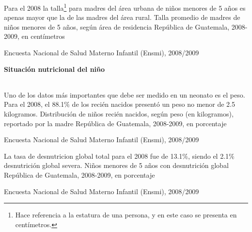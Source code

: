 
%
{%
	Para el 2008 la talla\footnote{Hace referencia a la estatura de una persona, y en este caso se presenta en centímetros.} para madres del área urbana de niños menores de 5 años es apenas mayor que la de las madres del área rural. 
}%
{%
	Talla promedio de madres  de niños menores de 5 años, según área de residencia} %
{%
	República de Guatemala, 2008-2009, en centímetros} %
{%
	\begin{tikzpicture}[x=1pt,y=1pt]    \end{tikzpicture}}%
{%
	Encuesta Nacional de Salud Materno Infantil (Ensmi), 2008/2009} %

\begin{center}
	\textbf{\color{color2}\LARGE \thesection} \quad  \textbf{\LARGE Situación nutricional del niño} 
\end{center} $ \ $\\[-5cm]
%
{%
	Uno de los datos más importantes que debe ser medido en un neonato es el peso.
	Para el 2008, el 88.1\% de los recién nacidos presentó un peso no menor de  2.5 kilogramos. 
}%
{%
	Distribución de niños recién nacidos, según peso (en kilogramos), reportado por la madre} %
{%
	República de Guatemala, 2008-2009, en porcentaje} %
{%
	\begin{tikzpicture}[x=1pt,y=1pt]    \end{tikzpicture}}%
{%
	Encuesta Nacional de Salud Materno Infantil (Ensmi), 2008/2009} %


%
{%
	La tasa de desnutricion global total para el 2008 fue de 13.1\%, siendo el 2.1\% desnutrición global severa. 
}%
{%
	Niños menores de 5 años con desnutrición global} %
{%
	República de Guatemala, 2008-2009, en porcentaje} %
{%
	\begin{tikzpicture}[x=1pt,y=1pt]    \end{tikzpicture}}%
{%
	Encuesta Nacional de Salud Materno Infantil (Ensmi), 2008/2009} %



